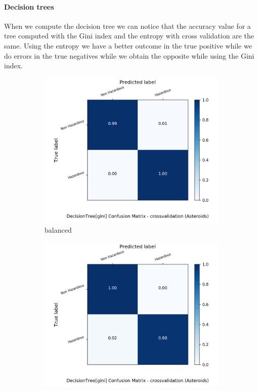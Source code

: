 \documentclass{article}
\begin{document}
\paragraph{Decision trees}
When we compute the decision tree we can notice that the  accuracy value for a tree computed with the Gini index and the entropy  with cross validation are the same. Using the entropy we have a better outcome in the true positive while we do errors in the true negatives while we obtain the opposite while using the Gini index.


\begin{figure}[H]
	\centering
	\begin{subfigure}{.5\textwidth}
		\centering
		\includegraphics[width=1.1\textwidth]{Plots/asteroids/asteroids_DecisionTree_gini_balance_True_crossvalidation.png}
		\caption{balanced}
	\end{subfigure}%
	\begin{subfigure}{.5\textwidth}
		\centering
		\includegraphics[width=1.1\textwidth]{Plots/asteroids/asteroids_DecisionTree_gini_balance_False_crossvalidation.png}

\end{subfigure}
\end{figure}
\end{document}

